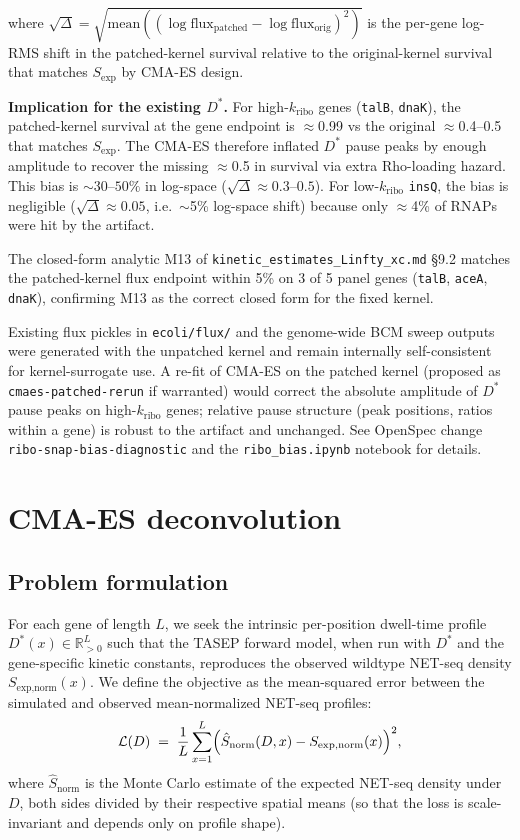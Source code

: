 \documentclass[11pt]{article}
\begin{document}
where $\sqrt{\Delta} = \sqrt{\text{mean}((\log
\text{flux}_{\text{patched}} - \log
\text{flux}_{\text{orig}})^2)}$ is the per-gene log-RMS shift in
the patched-kernel survival relative to the original-kernel survival
that matches $S_{\text{exp}}$ by CMA-ES design.

\textbf{Implication for the existing $D^*$.} For high-$k_{\text{ribo}}$
genes (\texttt{talB}, \texttt{dnaK}), the patched-kernel survival at
the gene endpoint is $\approx$0.99 vs the original $\approx$0.4--0.5
that matches $S_{\text{exp}}$. The CMA-ES therefore inflated $D^*$
pause peaks by enough amplitude to recover the missing
$\approx$0.5 in survival via extra Rho-loading hazard. This bias is
$\sim 30$--$50\%$ in log-space ($\sqrt{\Delta} \approx 0.3$--$0.5$).
For low-$k_{\text{ribo}}$ \texttt{insQ}, the bias is negligible
($\sqrt{\Delta} \approx 0.05$, i.e.\ $\sim$5\% log-space shift) because
only $\approx$4\% of RNAPs were hit by the artifact.

The closed-form analytic M13 of \texttt{kinetic\_estimates\_Linfty\_xc.md}
\S 9.2 matches the patched-kernel flux endpoint within 5\% on 3 of 5
panel genes (\texttt{talB}, \texttt{aceA}, \texttt{dnaK}), confirming
M13 as the correct closed form for the fixed kernel.

Existing flux pickles in \texttt{ecoli/flux/} and the genome-wide
BCM sweep outputs were generated with the unpatched kernel and remain
internally self-consistent for kernel-surrogate use. A re-fit of CMA-ES
on the patched kernel (proposed as \texttt{cmaes-patched-rerun} if
warranted) would correct the absolute amplitude of $D^*$ pause peaks
on high-$k_{\text{ribo}}$ genes; relative pause structure (peak
positions, ratios within a gene) is robust to the artifact and
unchanged. See OpenSpec change \texttt{ribo-snap-bias-diagnostic}
and the \texttt{ribo\_bias.ipynb} notebook for details.

\section{CMA-ES deconvolution}
\label{sec:cmaes}

\subsection{Problem formulation}

For each gene of length $L$, we seek the intrinsic per-position dwell-time
profile $D^*(x) \in \mathbb{R}_{>0}^L$ such that the TASEP forward model,
when run with $D^*$ and the gene-specific kinetic constants, reproduces the
observed wildtype NET-seq density $S_{\text{exp,norm}}(x)$. We define the
objective as the mean-squared error between the simulated and observed
mean-normalized NET-seq profiles:
\begin{equation}
  \mathcal{L}(D) \;=\; \frac{1}{L}\sum_{x=1}^{L}
    \Bigl(\hat{S}_{\text{norm}}(D, x) - S_{\text{exp,norm}}(x)\Bigr)^2,
\end{equation}
where $\hat{S}_{\text{norm}}$ is the Monte Carlo estimate of the expected
NET-seq density under $D$, both sides divided by their respective spatial
means (so that the loss is scale-invariant and depends only on profile shape).
\end{document}
